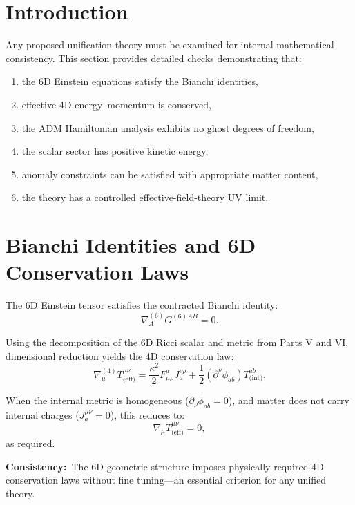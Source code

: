 \documentclass[12pt]{article}
\begin{document}
\newpage
\section{Introduction}

Any proposed unification theory must be examined for internal mathematical
consistency. This section provides detailed checks demonstrating that:
\begin{enumerate}
\item the 6D Einstein equations satisfy the Bianchi identities,
\item effective 4D energy–momentum is conserved,
\item the ADM Hamiltonian analysis exhibits no ghost degrees of freedom,
\item the scalar sector has positive kinetic energy,
\item anomaly constraints can be satisfied with appropriate matter content,
\item the theory has a controlled effective-field-theory UV limit.
\end{enumerate}


\newpage
\section{Bianchi Identities and 6D Conservation Laws}

The 6D Einstein tensor satisfies the contracted Bianchi identity:
\begin{equation}
\nabla^{(6)}_A G^{(6)AB} = 0.
\end{equation}

Using the decomposition of the 6D Ricci scalar and metric from Parts V and VI,
dimensional reduction yields the 4D conservation law:
\begin{equation}
\nabla^{(4)}_\mu T^{\mu\nu}_{\text{(eff)}}
=
\frac{\kappa^2}{2}
F^a_{\mu\rho} J_a^{\nu\rho}
+
\frac{1}{2} (\partial^\nu \phi_{ab}) T^{ab}_{\text{(int)}}.
\label{eq:4D-conserve}
\end{equation}

When the internal metric is homogeneous (\(\partial_\nu \phi_{ab}=0\)), and
matter does not carry internal charges (\(J_a^{\mu\nu}=0\)), this reduces to:
\[
\nabla_\mu T_{\text{(eff)}}^{\mu\nu} = 0,
\]
as required.

\noindent\textbf{Consistency:}\
The 6D geometric structure imposes physically required 4D conservation laws
without fine tuning—an essential criterion for any unified theory.
\end{document}

